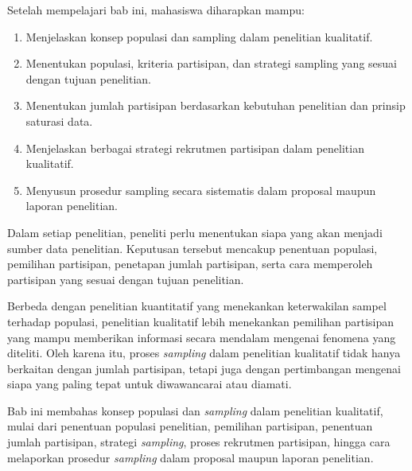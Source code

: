 \documentclass[
  indonesian,
  letterpaper,
  DIV=11,
  numbers=noendperiod]{scrreprt}
\providecommand{\tightlist}{%
  \setlength{\itemsep}{0pt}\setlength{\parskip}{0pt}}
\begin{document}
\begin{tcolorbox}[enhanced jigsaw, colframe=quarto-callout-note-color-frame, toptitle=1mm, breakable, leftrule=.75mm, arc=.35mm, toprule=.15mm, colback=white, colbacktitle=quarto-callout-note-color!10!white, bottomtitle=1mm, bottomrule=.15mm, titlerule=0mm, title=\textcolor{quarto-callout-note-color}{\faInfo}\hspace{0.5em}{Capaian Pembelajaran}, coltitle=black, left=2mm, opacitybacktitle=0.6, opacityback=0, rightrule=.15mm]

Setelah mempelajari bab ini, mahasiswa diharapkan mampu:

\begin{enumerate}
\def\labelenumi{\arabic{enumi}.}
\tightlist
\item
  Menjelaskan konsep populasi dan sampling dalam penelitian kualitatif.
\item
  Menentukan populasi, kriteria partisipan, dan strategi sampling yang
  sesuai dengan tujuan penelitian.
\item
  Menentukan jumlah partisipan berdasarkan kebutuhan penelitian dan
  prinsip saturasi data.
\item
  Menjelaskan berbagai strategi rekrutmen partisipan dalam penelitian
  kualitatif.
\item
  Menyusun prosedur sampling secara sistematis dalam proposal maupun
  laporan penelitian.
\end{enumerate}

\end{tcolorbox}

Dalam setiap penelitian, peneliti perlu menentukan siapa yang akan
menjadi sumber data penelitian. Keputusan tersebut mencakup penentuan
populasi, pemilihan partisipan, penetapan jumlah partisipan, serta cara
memperoleh partisipan yang sesuai dengan tujuan penelitian.

Berbeda dengan penelitian kuantitatif yang menekankan keterwakilan
sampel terhadap populasi, penelitian kualitatif lebih menekankan
pemilihan partisipan yang mampu memberikan informasi secara mendalam
mengenai fenomena yang diteliti. Oleh karena itu, proses \emph{sampling}
dalam penelitian kualitatif tidak hanya berkaitan dengan jumlah
partisipan, tetapi juga dengan pertimbangan mengenai siapa yang paling
tepat untuk diwawancarai atau diamati.

Bab ini membahas konsep populasi dan \emph{sampling} dalam penelitian
kualitatif, mulai dari penentuan populasi penelitian, pemilihan
partisipan, penentuan jumlah partisipan, strategi \emph{sampling},
proses rekrutmen partisipan, hingga cara melaporkan prosedur
\emph{sampling} dalam proposal maupun laporan penelitian.
\end{document}
